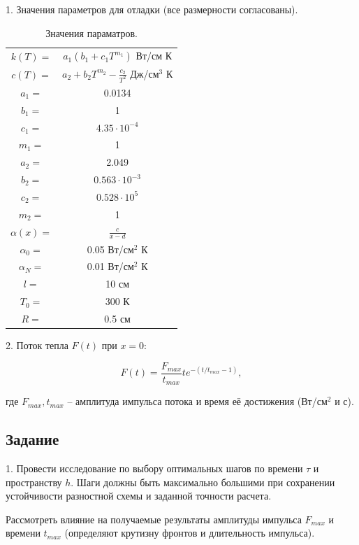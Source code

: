 \documentclass[a4paper,14pt]{article}
\begin{document}
1. Значения параметров для отладки (все размерности согласованы).

\begin{table}[!h]
	\caption{\label{tab.canonsummary} Значения параматров.}
	\begin{center}
	\begin{tabular}{|c c|}
	\hline
	$k(T) = $ & $a_1 (b_1 + c_1 T^{m_1})$ Вт/см К \\
	$c(T) = $ & $a_2 + b_2 T^{m_2} - \frac{c_2}{T^2} $ Дж/см$^3$ К \\
	$a_1 = $ & 0.0134 \\
	$b_1 = $ & 1 \\
	$c_1 = $ & $4.35 \cdot 10^{-4} $ \\
	$m_1 = $ & 1 \\
	$a_2 = $ & 2.049 \\
	$b_2 = $ & $0.563 \cdot 10^{-3}$ \\
	$c_2 = $ & $0.528 \cdot 10^{5}$ \\
	$m_2 =$ & 1 \\
	$\alpha (x) =$ & $\frac{c}{x-d}$ \\
	$\alpha_0 =$ & 0.05 Вт/см$^2$ К \\
	$\alpha_N =$ & 0.01 Вт/см$^2$ К \\
	$l =$ & 10 см \\
	$T_0 =$ & 300 К \\
	$R =$ & 0.5 см \\
	\hline
	\end{tabular}
	\end{center}
	\end{table}

2. Поток тепла $F(t)$ при $x = 0$:

\begin{equation}
	F(t) = \frac{F_{max}}{t_{max}} t e^{- (t/t_{max} - 1)},
\end{equation}

где $F_{max}, t_{max}$ -- амплитуда импульса потока и время её достижения (Вт/см$^2$ и с).

\subsection*{Задание}

1. Провести исследование по выбору оптимальных шагов по времени $\tau$
и пространству $h$. Шаги должны быть максимально большими при сохранении устойчивости разностной схемы и заданной точности расчета.

Рассмотреть влияние на получаемые результаты амплитуды импульса $F_{max}$
и времени $t_{max}$ (определяют крутизну фронтов и длительность импульса). 
\end{document}
